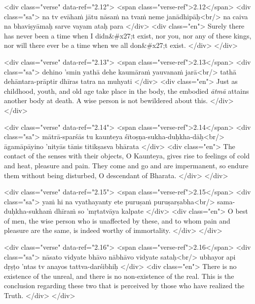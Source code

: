 \begin{html}
<div class="verse" data-ref="2.12">
  <span class="verse-ref">2.12</span>
  <div class="sa">
    na tv evāhaṁ jātu nāsaṁ na tvaṁ neme janādhipāḥ<br/>
    na caiva na bhaviṣyāmaḥ sarve vayam ataḥ para
  </div>
  <div class="en">
    Surely there has never been a time when I didn&#x27;t exist, nor you, nor any of these kings, nor will there ever be a time when we all don&#x27;t exist.
  </div>
</div>
\end{html}



\begin{html}
<div class="verse" data-ref="2.13">
  <span class="verse-ref">2.13</span>
  <div class="sa">
    dehino ’smin yathā dehe kaumāraṁ yauvanaṁ jarā<br/>
    tathā dehāntara-prāptir dhīras tatra na muhyati
  </div>
  <div class="en">
    Just as childhood, youth, and old age take place in the body, the embodied \textit{ātmā} attains another body at death. A wise person is not bewildered about this.
  </div>
</div>
\end{html}



\begin{html}
<div class="verse" data-ref="2.14">
  <span class="verse-ref">2.14</span>
  <div class="sa">
    mātrā-sparśās tu kaunteya śītoṣṇa-sukha-duḥkha-dāḥ<br/>
    āgamāpāyino ’nityās tāṁs titikṣasva bhārata
  </div>
  <div class="en">
    The contact of the senses with their objects, O Kaunteya, gives rise to feelings of cold and heat, pleasure and pain. They come and go and are impermanent, so endure them without being disturbed, O descendant of Bharata.
  </div>
</div>
\end{html}



\begin{html}
<div class="verse" data-ref="2.15">
  <span class="verse-ref">2.15</span>
  <div class="sa">
    yaṁ hi na vyathayanty ete puruṣaṁ puruṣarṣabha<br/>
    sama-duḥkha-sukhaṁ dhīraṁ so ’mṛtatvāya kalpate
  </div>
  <div class="en">
    O best of men, the wise person who is unaffected by these, and to whom pain and pleasure are the same, is indeed worthy of immortality.
  </div>
</div>
\end{html}



\begin{html}
<div class="verse" data-ref="2.16">
  <span class="verse-ref">2.16</span>
  <div class="sa">
    nāsato vidyate bhāvo nābhāvo vidyate sataḥ<br/>
    ubhayor api dṛṣṭo ’ntas tv anayos tattva-darśibhiḥ
  </div>
  <div class="en">
    There is no existence of the unreal, and there is no non-existence of the real. This is the conclusion regarding these two that is perceived by those who have realized the Truth.
  </div>
</div>
\end{html}



